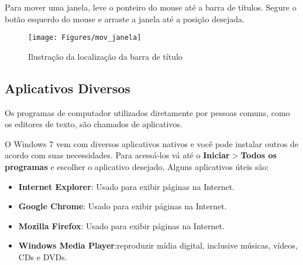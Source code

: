 \documentclass[hidelinks,12pt]{article}
\begin{document}
Para mover uma janela, leve o ponteiro do mouse até a barra de títulos. Segure o botão esquerdo do mouse e arraste a janela até a posição desejada.

\begin{figure}[!h]
	\centering
	\texttt{[image: Figures/mov\_janela]}
	\caption{Ilustração da localização da barra de título}
	\label{fig:movendo janela}
\end{figure}

\subsection{Aplicativos Diversos}

Os programas de computador utilizados diretamente por pessoas comuns, como os editores de texto, são chamados de aplicativos.

O Windows 7 vem com diversos aplicativos nativos e você pode instalar outros de acordo com suas necessidades. Para acessá-los vá até o {\bf Iniciar$>$Todos os programas} e escolher o aplicativo desejado. Alguns aplicativos úteis são:

\begin{itemize}
	\item{
		{\bf Internet Explorer}: Usado para exibir páginas na Internet.
    }



    \item{
    	{\bf Google Chrome}: Usado para exibir páginas na Internet.
    	}

	\item{
		{\bf Mozilla Firefox}: Usado para exibir páginas na Internet.
		}


	\item{
		{\bf Windows Media Player}:reproduzir mídia digital, inclusive músicas, vídeos, CDs e DVDs.
		}

\end{itemize}
\end{document}
